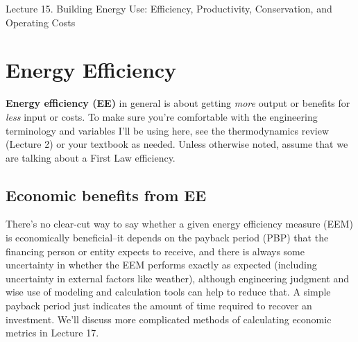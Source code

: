 \documentclass[10pt]{article}
\begin{document}
   \noindent
   \begin{center}

   \hrulefill
   
   \vspace{5pt}
   
   \vspace{0pt}
   
   {\Large \hfill  Lecture 15. Building Energy Use: Efficiency, Productivity, Conservation, and Operating Costs}
   \vspace{5pt}
  
{\color{blue}
{}
  }
   \hrulefill
   \end{center}


\section{Energy Efficiency}

\textbf{Energy efficiency (EE)} in general is about getting \textit{more} output or benefits for \textit{less} input or costs. To make sure you're comfortable with the engineering terminology and variables I'll be using here, see the thermodynamics review (Lecture 2) or your textbook as needed. Unless otherwise noted, assume that we are talking about a First Law efficiency.

\subsection{Economic benefits from EE}

There's no clear-cut way to say whether a given energy efficiency measure (EEM) is economically beneficial--it depends on the payback period (PBP)  that the financing person or entity expects to receive, and there is always some uncertainty in whether the EEM performs exactly as expected (including uncertainty in external factors like weather), although engineering judgment and wise use of modeling and calculation tools can help to reduce that. A simple payback period just indicates the amount of time required to recover an investment. We'll discuss more complicated methods of calculating economic metrics in Lecture 17.
\end{document}
